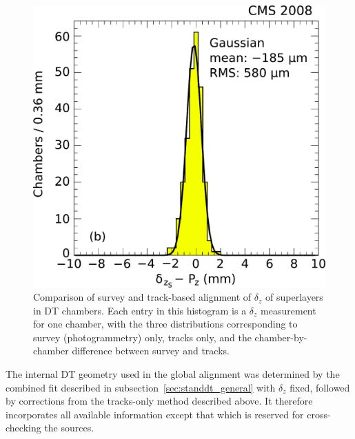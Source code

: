 \begin{figure}
  \begin{center}
  \includegraphics[width=0.5\linewidth]{plots/standalone_dt_alignment/DiffereceancesAllSurveyTracks.pdf}
  \end{center}
  \caption{Comparison of survey and track-based alignment of $\delta_z$ of superlayers in DT chambers.  Each entry in this histogram is a $\delta_z$ measurement for one chamber, with the three distributions corresponding to survey (photogrammetry) only, tracks only, and the chamber-by-chamber difference between survey and tracks. \label{fig:surveyvstracks}}
\end{figure}

The internal DT geometry used in the global alignment was determined
by the combined fit described in subsection~\ref{sec:standdt_general}
with $\delta_z$ fixed, followed by corrections from the tracks-only
method described above.  It therefore incorporates all available
information except that which is reserved for cross-checking the
sources.
